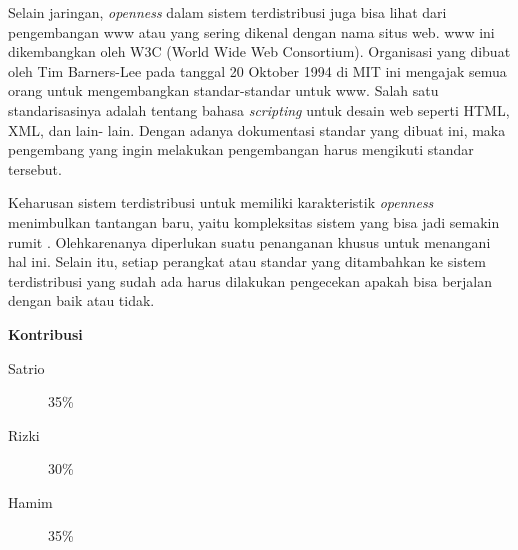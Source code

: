 \documentclass[12pt,a4paper]{apa}
\begin{document}
	Selain jaringan, \emph{openness} dalam sistem terdistribusi juga bisa lihat dari pengembangan www atau yang sering dikenal dengan nama situs web. www ini dikembangkan oleh W3C (World Wide Web Consortium). Organisasi yang dibuat oleh Tim Barners-Lee pada tanggal 20 Oktober 1994 di MIT ini mengajak semua orang untuk mengembangkan standar-standar untuk www. Salah satu standarisasinya adalah tentang bahasa \emph{scripting} untuk desain web seperti HTML, XML, dan lain- lain. Dengan adanya dokumentasi standar yang dibuat ini, maka pengembang yang ingin melakukan pengembangan harus mengikuti standar tersebut. 
	
	Keharusan sistem terdistribusi untuk memiliki karakteristik \emph{openness} menimbulkan tantangan baru, yaitu kompleksitas sistem yang bisa jadi semakin rumit \cite{Coulouris2012}. Olehkarenanya diperlukan suatu penanganan khusus untuk menangani hal ini. Selain itu, setiap perangkat atau standar yang ditambahkan ke sistem terdistribusi yang sudah ada harus dilakukan pengecekan apakah bisa berjalan dengan baik atau tidak. \cite{Coulouris2012}
	
	
	
	\newpage
	
	\begin{center}
		\textbf{Kontribusi}
	\end{center}
	\begin{description}
		\item[Satrio] 35\%
		\item[Rizki] 30\%
		\item[Hamim] 35\%
	\end{description}
\end{document}
